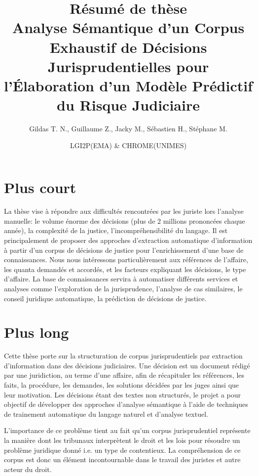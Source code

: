 \documentclass[12pt,a4paper,oneside]{article}
\author{Gildas T. N., Guillaume Z., Jacky M., Sébastien H., Stéphane M.}
\title{\textbf{Résumé de thèse \\ \vspace{0.5cm} \normalsize \og Analyse Sémantique d'un Corpus Exhaustif de Décisions Jurisprudentielles pour l'Élaboration d'un Modèle Prédictif du Risque Judiciaire \fg{} }}
\date{LGI2P(EMA) \& CHROME(UNIMES)}
\begin{document}
\nocite{}

\maketitle

\section{Plus court}

La thèse vise à répondre aux difficultés rencontrées par les juriste lors l'analyse manuelle: le volume énorme des décisions (plus de 2 millions prononcées chaque année), la complexité de la justice, l'incompréhensibilité du langage. Il est principalement de proposer des approches d'extraction automatique d'information à partir d'un corpus de décisions de justice pour l'enrichissement d'une base de connaissances. Nous nous intéressons particulièrement aux références de l'affaire, les quanta demandés et accordés, et les facteurs expliquant les décisions, le type d'affaire. La base de connaissances servira à automatiser différents services et analyses comme l'exploration de la jurisprudence, l'analyse de cas similaires, le conseil juridique automatique, la prédiction de décisions de justice.

\section{Plus long}


Cette thèse porte sur la structuration de corpus jurisprudentiels par extraction d'information dans des décisions judiciaires. Une décision est un document rédigé par une juridiction, au terme d'une affaire, afin de récapituler les références, les faits, la procédure, les demandes, les solutions décidées par les juges ainsi que leur motivation. Les décisions étant des textes non structurés, le projet a pour objectif de développer des approches d'analyse sémantique à l'aide de techniques de trainement automatique du langage naturel et d'analyse textuel.
%
 
L'importance de ce problème tient au fait qu'un corpus jurisprudentiel représente la manière dont les tribunaux interprètent le droit et les lois pour résoudre un problème juridique donné i.e. un type de contentieux. La compréhension de ce corpus est donc un élément incontournable dans le travail des juristes et autre acteur du droit. 
\end{document}
